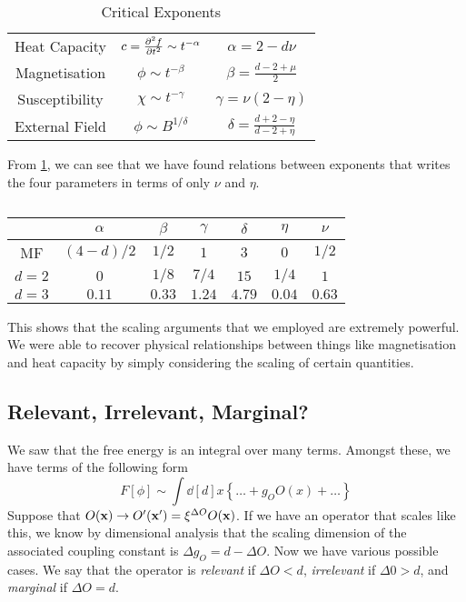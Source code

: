 
\begin{table}[htpb]
  \centering
  \begin{tabular}{|c |c |c|}
    \hline
    Heat Capacity & $c = \pdv[2]{f}{t} \sim t^{-\alpha}$ & $\alpha = 2 - d \nu$ \\
    Magnetisation & $\phi \sim t^{-\beta}$ & $\beta = \frac{d - 2 + \mu}{2}$ \\
    Susceptibility & $\chi \sim t^{-\gamma}$ & $\gamma = \nu(2 - \eta)$ \\
    External Field & $\phi\sim B^{1 / \delta}$ & $\delta = \frac{d + 2 - \eta}{d - 2 + \eta}$ \\
    \hline
  \end{tabular}
  \caption{Critical Exponents}
  \label{tab:critexp}
\end{table}

From \ref{tab:critexp}, we can see that we have found relations between exponents that writes the four parameters in terms of only $\nu$ and $\eta$.

\begin{table}[htpb]
  \centering
  \begin{tabular}{c | c c c c c c}
     & $\alpha$ & $\beta$ & $\gamma$ & $\delta$ & $\eta$ & $\nu$ \\
     \hline
    MF & $(4 - d) / 2$ & $1/2$ & $1$ & $3$ & $0$ & $1/2$ \\
    $d = 2$ & $0$ & $1 / 8$ & $7/4$ & $15$ & $1/4$ & $1$ \\
    $d = 3$ & $0.11$ & $0.33$ & $1.24$ & $4.79$ & $0.04$ & $0.63$ \\
  \end{tabular}
  \caption{}
  \label{tab:critexpvals}
\end{table}

This shows that the scaling arguments that we employed are extremely powerful.
We were able to recover physical relationships between things like magnetisation and heat capacity by simply considering the scaling of certain quantities.

\subsection{Relevant, Irrelevant, Marginal?}%
\label{sub:relevant_irrelevant_marginal_again}

We saw that the free energy is an integral over many terms. Amongst these, we have terms of the following form
\begin{equation}
  F[\phi] \sim \int \dd[d]{x} \left\{ \dots + g_O O(x) + \dots \right\}
\end{equation}
Suppose that $O(\vb{x}) \to O'(\vb{x}') = \xi^{\Delta O} O(\vb{x})$. If we have an operator that scales like this, we know by dimensional analysis that the scaling dimension of the associated coupling constant is $\Delta g_O = d - \Delta O$.
Now we have various possible cases. We say that the operator is \emph{relevant} if $\Delta O < d$, \emph{irrelevant} if $\Delta 0 > d$, and \emph{marginal} if $\Delta O = d$.

